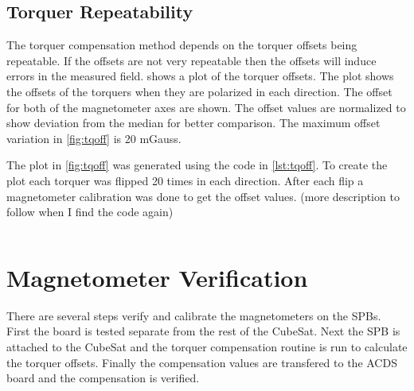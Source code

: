 \subsection{Torquer Repeatability}


The torquer compensation method depends on the torquer offsets being repeatable. If the offsets are not very repeatable then the offsets will induce errors in the measured field.  shows a plot of the torquer offsets. The plot shows the offsets of the torquers when they are polarized in each direction. The offset for both of the magnetometer axes are shown. The offset values are normalized to show deviation from the median for better comparison. The maximum offset variation in \cref{fig:tqoff} is 20 mGauss.



The plot in \cref{fig:tqoff} was generated using the code in \cref{lst:tqoff}. To create the plot each torquer was flipped 20 times in each direction. After each flip a magnetometer calibration was done to get the offset values. (more description to follow when I find the code again)

\begin{lstlisting}[style=code,caption={Code to measure torquer repeatibility for the Y+ axis},label={lst:tqoff},language=Matlab]
%TODO: find the code that I used to make the plot...
\end{lstlisting}


\section{Magnetometer Verification}

There are several steps verify and calibrate the magnetometers on the \acp{SPB}. First the board is tested separate from the rest of the CubeSat. Next the \ac{SPB} is attached to the CubeSat and the torquer compensation routine is run to calculate the torquer offsets. Finally the compensation values are transfered to the \ac{ACDS} board and the compensation is verified.


